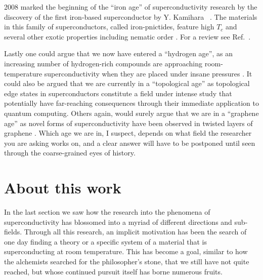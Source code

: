 2008 marked the beginning of the ``iron age'' of superconductivity research by the discovery of the first iron-based superconductor  by
Y. Kamihara \etal\ \cite{Kamihara08}. The materials in this family of superconductors, called iron-pnictides, feature high $T_c$ and several other exotic
properties including nematic order \cite{Fernandes14}. For a review see Ref.~\cite{Paglione10}.

Lastly one could argue that we now have entered a ``hydrogen age'', as an increasing number of hydrogen-rich compounds are approaching room-temperature
superconductivity when they are placed under insane pressures \cite{Semenok20, Snider20}. It could also be argued that we are currently in a
``topological age'' as topological edge states in superconductors constitute a field under intense study \cite{Wang20} that potentially have far-reaching
consequences through their immediate application to quantum computing. Others again, would surely argue that we are in a ``graphene age'' as 
novel forms of superconductivity have been observed in twisted layers of graphene \cite{Park21}.
Which age we are in, I suspect, depends on what field the researcher
you are asking works on, and a clear answer will have to be postponed until seen through the coarse-grained eyes of history.


\section{About this work}

In the last section we saw how the research into the phenomena of superconductivity has blossomed into a myriad of different directions and sub-fields. Through
all this research, an implicit motivation has been the search of one day finding a theory or a specific system of a material that is superconducting at
room temperature. This has become a goal, similar to how the alchemists searched for the philosopher's stone, that we still have not quite reached,
but whose continued pursuit itself has borne numerous fruits. 

